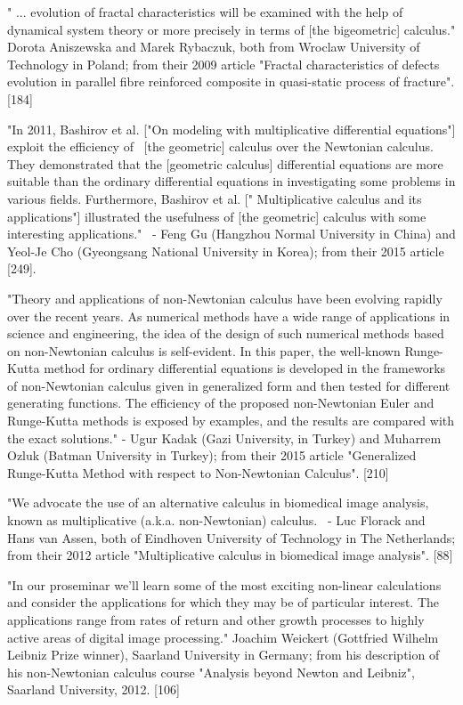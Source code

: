 \documentclass[12pt]{article}
\begin{document}
" ... evolution of fractal characteristics will be examined with the help of dynamical system theory or more precisely in terms of [the bigeometric] calculus." 
Dorota Aniszewska and Marek Rybaczuk, both from Wroclaw University of Technology in Poland; from their 2009 article "Fractal characteristics of defects evolution in parallel fibre reinforced composite in quasi-static process of fracture". [184]

"In 2011, Bashirov et al. ["On modeling with multiplicative differential equations"] exploit the efficiency of  [the geometric] calculus over the Newtonian calculus. They demonstrated that the [geometric calculus] differential equations are more suitable than the ordinary differential equations in investigating some problems in various fields. Furthermore, Bashirov et al. [" Multiplicative calculus and its applications"] illustrated the usefulness of [the geometric] calculus with some interesting applications."
 - Feng Gu (Hangzhou Normal University in China) and Yeol-Je Cho (Gyeongsang National University in Korea); from their 2015 article [249].

"Theory and applications of non-Newtonian calculus have been evolving rapidly over the recent years. As numerical methods have a wide range of applications in science and engineering, the idea of the design of such numerical methods based on non-Newtonian calculus is self-evident. In this paper, the well-known Runge-Kutta method for ordinary differential equations is developed in the frameworks of non-Newtonian calculus given in generalized form and then tested for different generating functions. The efficiency of the proposed non-Newtonian Euler and Runge-Kutta methods is exposed by examples, and the results are compared with the exact solutions."
 - Ugur Kadak (Gazi University, in Turkey) and Muharrem Ozluk (Batman University in Turkey); from their 2015 article "Generalized Runge-Kutta Method with respect to Non-Newtonian Calculus". [210]

"We advocate the use of an alternative calculus in biomedical image analysis, known as multiplicative (a.k.a. non-Newtonian) calculus.
 - Luc Florack and Hans van Assen, both of Eindhoven University of Technology in The Netherlands; from their 2012 article "Multiplicative calculus in biomedical image analysis". [88]

"In our proseminar we'll learn some of the most exciting non-linear calculations and consider the applications for which they may be of particular interest. The applications range from rates of return and other growth processes to highly active areas of digital image processing."
Joachim Weickert (Gottfried Wilhelm Leibniz Prize winner), Saarland University in Germany; from his description of his non-Newtonian calculus course "Analysis beyond Newton and Leibniz", Saarland University, 2012. [106]
\end{document}
